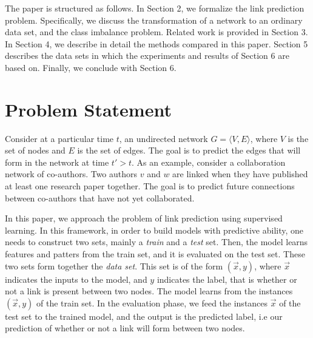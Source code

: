 \documentclass{acm_proc_article-sp}
\begin{document}

The paper is structured as follows. In Section 2, we formalize the link prediction problem. Specifically, we discuss the transformation of a network to an ordinary data set, and the class imbalance problem. Related work is provided in Section 3. In Section 4, we describe in detail the methods compared in this paper. Section 5 describes the data sets in which the experiments and results of Section 6 are based on. Finally, we conclude with Section 6.  


\section{Problem Statement}

Consider at a particular time $t$, an undirected network $G = \langle V,E \rangle$, where $V$ is the set of nodes and $E$ is the set of edges. The goal is to predict the edges that will form in the network at time $t' > t$. As an example, consider a collaboration network of co-authors. Two authors $v$ and $w$ are linked when they have published at least one research paper together. The goal is to predict future connections between co-authors that have not yet collaborated.

In this paper, we approach the problem of link prediction using supervised learning. In this framework, in order to build models with predictive ability, one needs to construct two sets, mainly a \textit{train} and a \textit{test} set. Then, the model learns features and patters from the train set, and it is evaluated on the test set. These two sets form together the \textit{data set}. This set is of the form $(\vec{x},y)$, where $\vec{x}$ indicates the inputs to the model, and $y$ indicates the label, that is whether or not a link is present between two nodes. The model learns from the instances $(\vec{x},y)$ of the train set. In the evaluation phase, we feed the instances $\vec{x}$ of the test set to the trained model, and the output is the predicted label, i.e our prediction of whether or not a link will form between two nodes.
\end{document}
